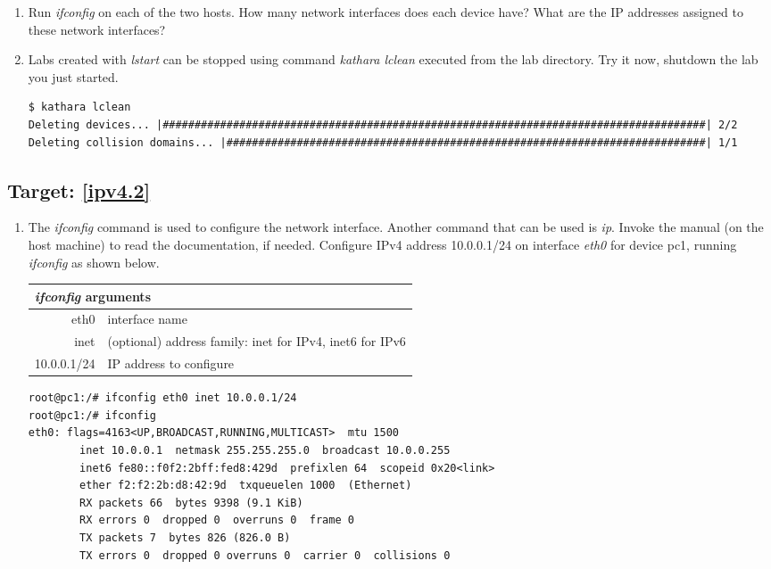 \documentclass[12pt]{book}
\begin{document}
\begin{enumerate}[label=\arabic*.]
\begin{enumerate}[label=Activity \arabic*:]
\item Run \emph{ifconfig} on each of the two hosts. How many network interfaces does each device have? What are the IP addresses assigned to these network interfaces?

\item Labs created with \emph{lstart} can be stopped using command \emph{kathara lclean} executed from the lab directory. Try it now, shutdown the lab you just started.

  \begin{lstlisting}
$ kathara lclean
Deleting devices... |#####################################################################################| 2/2
Deleting collision domains... |###########################################################################| 1/1
  \end{lstlisting}

\end{enumerate}

\subsection{Target: \ref{ipv4.2}}\label{ipv4.2.se}
  
\begin{enumerate}[resume*]
\item The \emph{ifconfig} command is used to configure the network interface. Another command that can be used is \emph{ip}. Invoke the manual (on the host machine) to read the documentation, if needed. Configure IPv4 address 10.0.0.1/24 on interface \emph{eth0} for device pc1, running \emph{ifconfig} as shown below.

  \begin{tabular}{r l}
    \toprule
    \multicolumn{2}{l}{\emph{ifconfig} arguments} \\ \midrule
    eth0 & interface name \\
    inet & (optional) address family: inet for IPv4, inet6 for IPv6 \\
    10.0.0.1/24 & IP address to configure \\ \bottomrule
  \end{tabular}

  \begin{lstlisting}
root@pc1:/# ifconfig eth0 inet 10.0.0.1/24
root@pc1:/# ifconfig
eth0: flags=4163<UP,BROADCAST,RUNNING,MULTICAST>  mtu 1500
        inet 10.0.0.1  netmask 255.255.255.0  broadcast 10.0.0.255
        inet6 fe80::f0f2:2bff:fed8:429d  prefixlen 64  scopeid 0x20<link>
        ether f2:f2:2b:d8:42:9d  txqueuelen 1000  (Ethernet)
        RX packets 66  bytes 9398 (9.1 KiB)
        RX errors 0  dropped 0  overruns 0  frame 0
        TX packets 7  bytes 826 (826.0 B)
        TX errors 0  dropped 0 overruns 0  carrier 0  collisions 0


\end{lstlisting}
\end{enumerate}
\end{enumerate}
\end{document}
